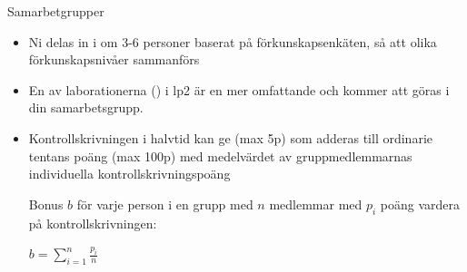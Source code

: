 \fi

\ifkompendium\else




\begin{SlideExtra}{Samarbetgrupper}\footnotesize
\begin{itemize}
\item Ni delas in i  om 3-6 personer baserat på förkunskapsenkäten, så att olika förkunskapsnivåer sammanförs
\item En av laborationerna () i lp2 är en mer omfattande  och kommer att göras i din samarbetsgrupp. \\ \vspace{1em}
\item Kontrollskrivningen i halvtid kan ge  (max 5p) som adderas till ordinarie tentans poäng (max 100p) med medelvärdet av gruppmedlemmarnas individuella kontrollskrivningspoäng
\scriptsize \parbox{7cm}{Bonus $b$ för varje person i en grupp med $n$ medlemmar med $p_i$ poäng vardera på kontrollskrivningen:}
 \hspace{5mm} $\displaystyle b = \sum\limits_{i=1}^n \frac{p_i}{n}$
\end{itemize}
\end{SlideExtra}



